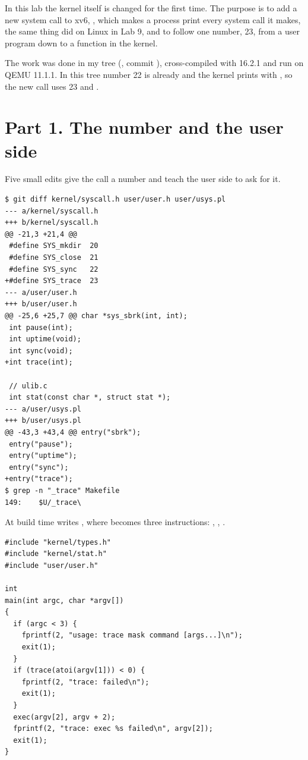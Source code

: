 \documentclass[11pt,a4paper]{article}
\begin{document}
\utmtitlepage
\tableofcontents
\newpage


In this lab the kernel itself is changed for the first time. The purpose is to add a new system
call to xv6, , which makes a process print every system call it makes, the same
thing  did on Linux in Lab 9, and to follow one number, 23, from a user program
down to a function in the kernel.

The work was done in my  tree (, commit
), cross-compiled with  16.2.1 and run on QEMU 11.1.1.
In this tree number 22 is already  and the kernel prints with , so the
new call uses 23 and .

\section{Part 1. The number and the user side}

Five small edits give the call a number and teach the user side to ask for it.

\begin{lstlisting}[caption={The number, the declaration, the stub and the UPROGS line}]
$ git diff kernel/syscall.h user/user.h user/usys.pl
--- a/kernel/syscall.h
+++ b/kernel/syscall.h
@@ -21,3 +21,4 @@
 #define SYS_mkdir  20
 #define SYS_close  21
 #define SYS_sync   22
+#define SYS_trace  23
--- a/user/user.h
+++ b/user/user.h
@@ -25,6 +25,7 @@ char *sys_sbrk(int, int);
 int pause(int);
 int uptime(void);
 int sync(void);
+int trace(int);
 
 // ulib.c
 int stat(const char *, struct stat *);
--- a/user/usys.pl
+++ b/user/usys.pl
@@ -43,3 +43,4 @@ entry("sbrk");
 entry("pause");
 entry("uptime");
 entry("sync");
+entry("trace");
$ grep -n "_trace" Makefile
149:	$U/_trace\
\end{lstlisting}

At build time  writes , where  becomes three
instructions: \code{li a7, SYS\_trace}, \code{ecall}, \code{ret}.

\begin{lstlisting}[style=ccode,caption={user/trace.c}]
#include "kernel/types.h"
#include "kernel/stat.h"
#include "user/user.h"

int
main(int argc, char *argv[])
{
  if (argc < 3) {
    fprintf(2, "usage: trace mask command [args...]\n");
    exit(1);
  }
  if (trace(atoi(argv[1])) < 0) {
    fprintf(2, "trace: failed\n");
    exit(1);
  }
  exec(argv[2], argv + 2);
  fprintf(2, "trace: exec %s failed\n", argv[2]);
  exit(1);
}
\end{lstlisting}
\end{document}
